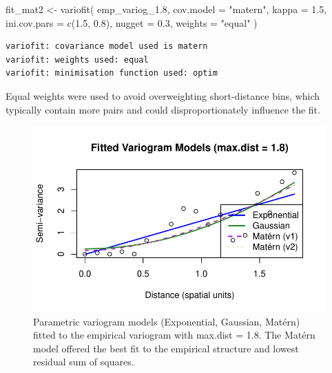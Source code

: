 \documentclass[
  11pt,
]{article}
\newenvironment{Shaded}{\begin{snugshade}}{\end{snugshade}}
\newcommand{\AttributeTok}[1]{\textcolor[rgb]{0.40,0.45,0.13}{#1}}
\newcommand{\FloatTok}[1]{\textcolor[rgb]{0.68,0.00,0.00}{#1}}
\newcommand{\FunctionTok}[1]{\textcolor[rgb]{0.28,0.35,0.67}{#1}}
\newcommand{\NormalTok}[1]{\textcolor[rgb]{0.00,0.23,0.31}{#1}}
\newcommand{\OtherTok}[1]{\textcolor[rgb]{0.00,0.23,0.31}{#1}}
\newcommand{\StringTok}[1]{\textcolor[rgb]{0.13,0.47,0.30}{#1}}
\begin{document}
\begin{Shaded}
\begin{Highlighting}[]
\NormalTok{fit\_mat2 }\OtherTok{\textless{}{-}} \FunctionTok{variofit}\NormalTok{(}
\NormalTok{  emp\_variog\_1}\FloatTok{.8}\NormalTok{,}
  \AttributeTok{cov.model =} \StringTok{"matern"}\NormalTok{,}
  \AttributeTok{kappa =} \FloatTok{1.5}\NormalTok{,}
  \AttributeTok{ini.cov.pars =} \FunctionTok{c}\NormalTok{(}\FloatTok{1.5}\NormalTok{, }\FloatTok{0.8}\NormalTok{),}
  \AttributeTok{nugget =} \FloatTok{0.3}\NormalTok{,}
  \AttributeTok{weights =} \StringTok{"equal"}
\NormalTok{)}
\end{Highlighting}
\end{Shaded}

\begin{verbatim}
variofit: covariance model used is matern 
variofit: weights used: equal 
variofit: minimisation function used: optim 
\end{verbatim}

Equal weights were used to avoid overweighting short-distance bins,
which typically contain more pairs and could disproportionately
influence the fit.

\begin{figure}[H]

{\centering \includegraphics{project_files/figure-pdf/fig-variogfit-1.pdf}

}

\caption{Parametric variogram models (Exponential, Gaussian, Matérn)
fitted to the empirical variogram with max.dist = 1.8. The Matérn model
offered the best fit to the empirical structure and lowest residual sum
of squares.}

\end{figure}%
\end{document}
